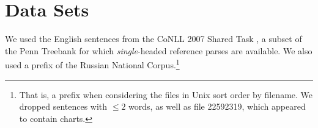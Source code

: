 \documentclass[11pt]{article}
\newcommand{\Note}[4][]{\todo[author=#2,color=#3,fancyline,#1]{#4}}
\newcommand{\noteJE}[2][]{\Note[#1]{JE}{green!40}{#2}}
\newcommand{\NoteJE}[2][]{\noteJE[inline,#1]{#2}}
\begin{document}





\section{Data Sets}
We used the English sentences from the CoNLL 2007 Shared Task \cite{CONLL-SHARED-2007}, a subset of the Penn Treebank for which {\em single}-headed reference parses are available.  We also used a prefix of the Russian National Corpus.\footnote{That is, a prefix when considering the files in Unix sort order by filename.  We dropped sentences with $\leq 2$ words, as well as file 22592319, which appeared to contain charts.}
\end{document}
